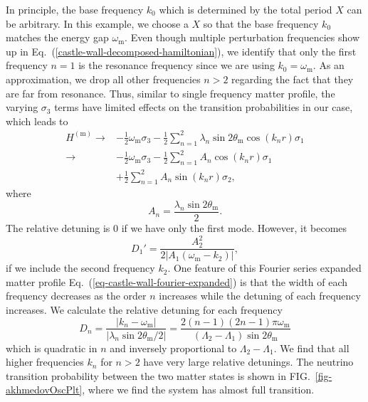 \documentclass[%
reprint,
 amsmath,amssymb,
 prd,
]{revtex4-1}
\newcommand{\RD}{D}
\begin{document}
In principle, the base frequency $k_0$ which is determined by the total period $X$ can be arbitrary. In this example, we choose a $X$ so that the base frequency $k_0$ matches the energy gap $\omega_{\mathrm{m}}$. Even though multiple perturbation frequencies show up in Eq.~(\ref{castle-wall-decomposed-hamiltonian}), we identify that only the first frequency $n=1$ is the resonance frequency since we are using $k_0=\omega_{\mathrm{m}}$. As an approximation, we drop all other frequencies $n>2$ regarding the fact that they are far from resonance. Thus, similar to single frequency matter profile, the varying $\sigma_3$ terms have limited effects on the transition probabilities in our case, which leads to
\begin{align*}
    H^{(\mathrm m)} \to & - \frac{1}{2}\omega_{\mathrm m} \sigma_3  - \frac{1}{2} \sum_{n=1}^2\lambda_n \sin 2\theta_{\mathrm m}  \cos\left( k_n r \right) \sigma_1\\
    \to & - \frac{1}{2}\omega_{\mathrm m} \sigma_3  - \frac{1}{2} \sum_{n=1}^2 A_n \cos ( k_n r) \sigma_1 \\
    & + \frac{1}{2} \sum_{n=1}^2A_n \sin(k_n r) \sigma_2,
\end{align*}
where
\begin{equation*}
A_n = \frac{\lambda_n \sin 2\theta_{\mathrm m} }{2} .
\end{equation*}
The relative detuning is $0$ if we have only the first mode. However, it becomes
\begin{equation}
\RD_1'= \frac{A_2^2}{2\lvert A_1 (\omega_{\mathrm m} - k_2) \rvert},   
\end{equation}
if we include the second frequency $k_2$. One feature of this Fourier series expanded matter profile Eq.~(\ref{eq-castle-wall-fourier-expanded}) is that the width of each frequency decreases as the order $n$ increases while the detuning of each frequency increases. We calculate the relative detuning for each frequency
\begin{equation}
\RD_n = \frac{\lvert k_n -\omega_{\mathrm m} \rvert}{ \lvert \lambda_n  \sin 2\theta_{\mathrm m}/2 \rvert } = \frac{2(n-1)(2n-1)\pi \omega_{\mathrm m}}{(\Lambda_2 - \Lambda_1)\sin 2\theta_{\mathrm m}}
\end{equation}
which is quadratic in $n$ and inversely proportional to $\Lambda_2-\Lambda_1$. We find that all higher frequencies $k_n$ for $n>2$ have very large relative detunings. The neutrino transition probability between the two matter states is shown in FIG.~\ref{fig-akhmedovOscPlt}, where we find the system has almost full transition.
\end{document}
